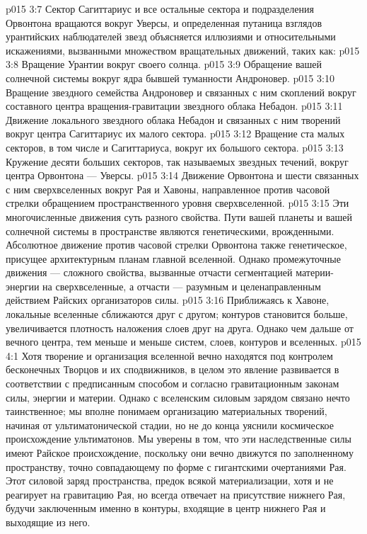 \vs p015 3:7 \pc Сектор Сагиттариус и все остальные сектора и подразделения Орвонтона вращаются вокруг Уверсы, и определенная путаница взглядов урантийских наблюдателей звезд объясняется иллюзиями и относительными искажениями, вызванными множеством вращательных движений, таких как:
\vs p015 3:8 \bibnobreakspace Вращение Урантии вокруг своего солнца.
\vs p015 3:9 \bibnobreakspace Обращение вашей солнечной системы вокруг ядра бывшей туманности Андроновер.
\vs p015 3:10 \bibnobreakspace Вращение звездного семейства Андроновер и связанных с ним скоплений вокруг составного центра вращения\hyp{}гравитации звездного облака Небадон.
\vs p015 3:11 \bibnobreakspace Движение локального звездного облака Небадон и связанных с ним творений вокруг центра Сагиттариус их малого сектора.
\vs p015 3:12 \bibnobreakspace Вращение ста малых секторов, в том числе и Сагиттариуса, вокруг их большого сектора.
\vs p015 3:13 \bibnobreakspace Кружение десяти больших секторов, так называемых звездных течений, вокруг центра Орвонтона --- Уверсы.
\vs p015 3:14 \bibnobreakspace Движение Орвонтона и шести связанных с ним сверхвселенных вокруг Рая и Хавоны, направленное против часовой стрелки обращением пространственного уровня сверхвселенной.
\vs p015 3:15 \pc Эти многочисленные движения суть разного свойства. Пути вашей планеты и вашей солнечной системы в пространстве являются генетическими, врожденными. Абсолютное движение против часовой стрелки Орвонтона также генетическое, присущее архитектурным планам главной вселенной. Однако промежуточные движения --- сложного свойства, вызванные отчасти сегментацией материи\hyp{}энергии на сверхвселенные, а отчасти --- разумным и целенаправленным действием Райских организаторов силы.
\vs p015 3:16 \pc Приближаясь к Хавоне, локальные вселенные сближаются друг с другом; контуров становится больше, увеличивается плотность наложения слоев друг на друга. Однако чем дальше от вечного центра, тем меньше и меньше систем, слоев, контуров и вселенных.
\vs p015 4:1 Хотя творение и организация вселенной вечно находятся под контролем бесконечных Творцов и их сподвижников, в целом это явление развивается в соответствии с предписанным способом и согласно гравитационным законам силы, энергии и материи. Однако с вселенским силовым зарядом связано нечто таинственное; мы вполне понимаем организацию материальных творений, начиная от ультиматонической стадии, но не до конца уяснили космическое происхождение ультиматонов. Мы уверены в том, что эти наследственные силы имеют Райское происхождение, поскольку они вечно движутся по заполненному пространству, точно совпадающему по форме с гигантскими очертаниями Рая. Этот силовой заряд пространства, предок всякой материализации, хотя и не реагирует на гравитацию Рая, но всегда отвечает на присутствие нижнего Рая, будучи заключенным именно в контуры, входящие в центр нижнего Рая и выходящие из него.
